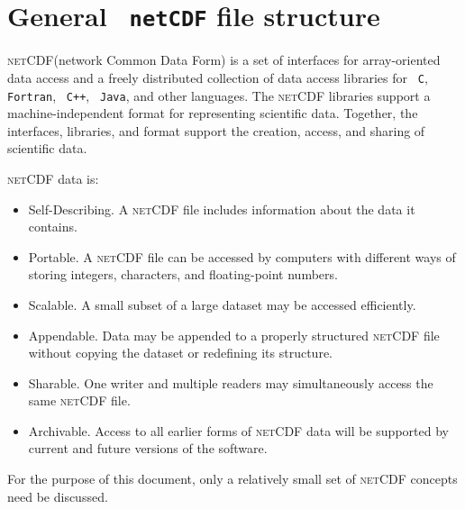 \documentclass[a4paper]{article}
\def\netCDF{\textsc{netCDF}\xspace}
\newcommand{\code}[1]{\textrm{\texttt{\hyphenchar\font=200 #1}}}
\begin{document}
\section{General \code{netCDF} file structure}

\netCDF (network Common Data Form) \cite{netCDF} is a set of interfaces for array-oriented data access and a freely distributed collection of data access libraries for \code{C}, \code{Fortran}, \code{C++}, \code{Java}, and other languages. The \netCDF libraries support a machine-independent format for representing scientific data. Together, the interfaces, libraries, and format support the creation, access, and sharing of scientific data.

\medskip
\noindent
\netCDF data is:
%
\begin{itemize}
 \item Self-Describing. A \netCDF file includes information about the data it contains.
 \item Portable. A \netCDF file can be accessed by computers with different ways of storing integers, characters, and floating-point numbers.
 \item Scalable. A small subset of a large dataset may be accessed efficiently.
 \item Appendable. Data may be appended to a properly structured \netCDF file without copying the dataset or redefining its structure.
 \item Sharable. One writer and multiple readers may simultaneously access the same \netCDF file.
 \item Archivable. Access to all earlier forms of \netCDF data will be supported by current and future versions of the software.
\end{itemize}
%
For the purpose of this document, only a relatively small set of \netCDF concepts need be discussed.
%
\end{document}
